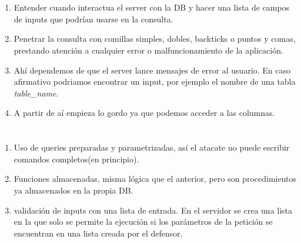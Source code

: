 \documentclass[12pt,a4paper,oneside,onecolumn]{article}
\begin{document}
	\section{}
	
	\begin{enumerate}
	\item 
	Entender cuando interactua el server con la DB y hacer una lista de campos de inputs que podr\'ian usarse en la consulta.
	\item 
	Penetrar la consulta con comillas simples, dobles, backticks o puntos y comas, prestando atenci\'on a cualquier error o malfuncionamiento de la aplicaci\'on.
	\item 
	Ah\'i dependemos de que el server lance mensajes de error al usuario. En caso afirmativo podriamos encontrar un input, por ejemplo el nombre de una tabla \emph{table\_name}.
	\item A partir de a\'i empieza lo gordo ya que podemos acceder a las columnas.
	\end{enumerate}
	
	\section{}
	\begin{enumerate}
	\item 
	Uso de queries preparadas y parametrizadas, as\'i el atacate no puede escribir comandos completos(en principio).
	\item
	Funciones almacenadas, misma l\'ogica que el anterior, pero son procedimientos ya almacenados en la propia DB.
	\item
	validaci\'on de inputs con una lista de entrada. En el servidor se crea una lista en la que solo se permite la ejecuci\'on si los par\'ametros de la petici\'on se encuentran en una lista creada por el defensor.
	
	\end{enumerate}
	
\end{document}
